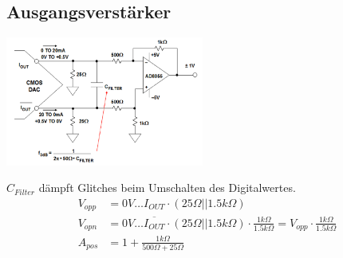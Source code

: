 \subsection{Ausgangsverstärker}
\begin{minipage}{7cm}
	\includegraphics[width=6.5cm]{images/Ausgangsverstaerker.png}
\end{minipage}
\begin{minipage}{12cm}
  $C_{Filter}$ dämpft Glitches beim Umschalten des Digitalwertes.
  \begin{align*}
  	V_{opp} &= 0V \hdots I_{OUT} \cdot (25\Omega || 1.5k\Omega) \\
  	V_{opn} &= 0V \hdots \overline{I_{OUT}} \cdot (25\Omega || 1.5k\Omega) \cdot \frac{1k\Omega}{1.5k\Omega} = V_{opp} \cdot \frac{1k\Omega}{1.5k\Omega} \\
  	A_{pos} &= 1 + \frac{1k\Omega}{500\Omega + 25\Omega}
  \end{align*}
\end{minipage}

